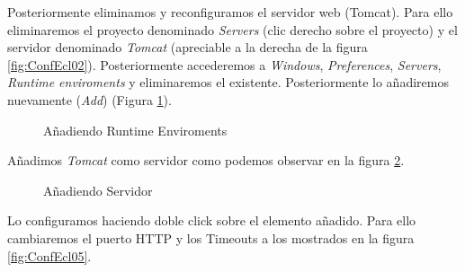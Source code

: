 \documentclass{scrartcl}
\begin{document}
Posteriormente eliminamos y reconfiguramos el servidor web (Tomcat). Para ello eliminaremos el proyecto denominado \textit{Servers} (clic derecho sobre el proyecto) y el servidor denominado \textit{Tomcat} (apreciable a la derecha de la figura \ref{fig:ConfEcl02}). Posteriormente accederemos a \textit{Windows}, \textit{Preferences}, \textit{Servers}, \textit{Runtime enviroments} y eliminaremos el existente. Posteriormente lo añadiremos nuevamente (\textit{Add}) (Figura \ref{fig:ConfEcl03}).
\begin{figure}[H]
	
	\centering
	\caption{Añadiendo Runtime Enviroments}
	\label{fig:ConfEcl03}
	
\end{figure}

Añadimos \textit{Tomcat} como servidor como podemos observar en la figura \ref{fig:ConfEcl04}.

\begin{figure}[H]
	\centering
	\caption{Añadiendo Servidor}
	\label{fig:ConfEcl04}
	
\end{figure}
Lo configuramos haciendo doble click sobre el elemento añadido. Para ello cambiaremos el puerto HTTP y los Timeouts a los mostrados en la figura \ref{fig:ConfEcl05}.
\end{document}

